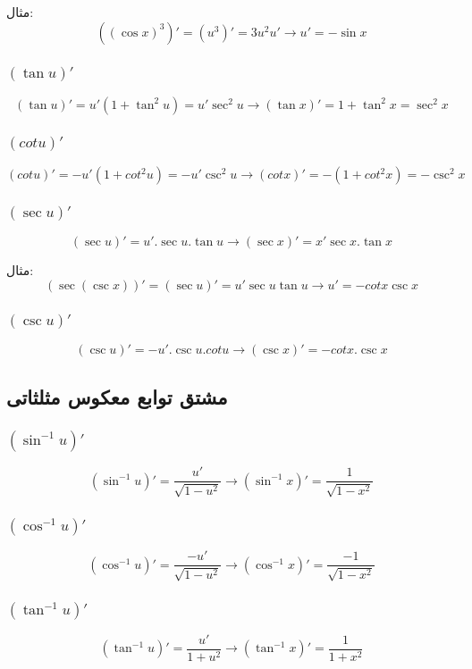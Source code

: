 مثال:
\[ ((\cos x)^3)' = (u^3)' = 3u^2u' \to u' = -\sin x \]

\subsubsection{$(\tan u)'$}
\[ (\tan u)' = u'(1+\tan^2u) = u'\sec^2u \to (\tan x)' = 1+\tan^2 x = \sec^2 x \]

\subsubsection{$(cot u)'$}
\[ (cot u)' = -u'(1+cot^2u) = -u'\csc^2u \to (cot x)' = -(1+cot^2x) = -\csc^2x \]

\subsubsection{$(\sec u)'$}
\[ (\sec u)' = u'.\sec u.\tan u \to (\sec x)' = x'\sec x.\tan x \]

مثال:
\[ (\sec(\csc x))' = (\sec u)' = u'\sec u\tan u \to u' = -cot x \csc x \]


\subsubsection{$(\csc u)'$}
\[ (\csc u)' = -u'.\csc u.cot u \to (\csc x)' = -cot x.\csc x \]


\subsection{مشتق توابع معکوس مثلثاتی}
\subsubsection{$(\sin^{-1} u)'$}
\[ (\sin^{-1} u)' = \frac{u'}{\sqrt{1-u^2}} \to (\sin^{-1}x)' = \frac{1}{\sqrt{1-x^2}} \]

\subsubsection{$(\cos^{-1} u)'$}
\[ (\cos^{-1} u)' = \frac{-u'}{\sqrt{1-u^2}} \to (\cos^{-1}x)' = \frac{-1}{\sqrt{1-x^2}} \]

\subsubsection{$(\tan^{-1} u)'$}
\[ (\tan^{-1} u)' = \frac{u'}{1+u^2} \to (\tan^{-1}x)' = \frac{1}{1+x^2} \]

